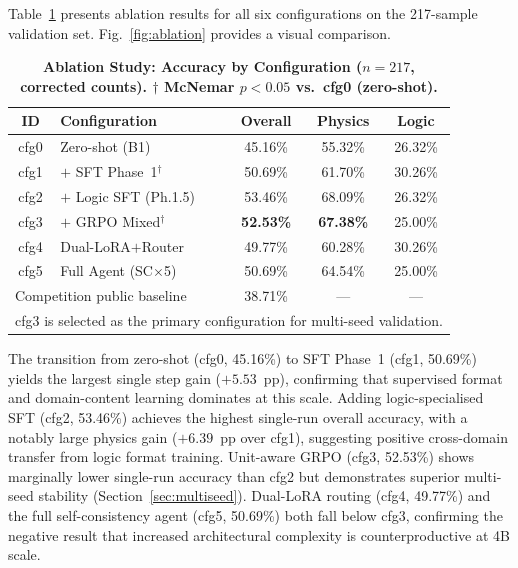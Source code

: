 \documentclass{ieeeaccess}
\begin{document}
Table~\ref{tab:ablation} presents ablation results for all six
configurations on the 217-sample validation set.
Fig.~\ref{fig:ablation} provides a visual comparison.

\begin{table}[t]
\caption{\textbf{Ablation Study: Accuracy by Configuration
  ($n=217$, corrected counts).
  $\dagger$ McNemar $p<0.05$ vs.\ cfg0 (zero-shot).}}
\label{tab:ablation}
\centering
\setlength{\tabcolsep}{3.5pt}
\begin{tabular}{clccc}
\toprule
\textbf{ID} & \textbf{Configuration}
  & \textbf{Overall} & \textbf{Physics} & \textbf{Logic} \\
\midrule
cfg0 & Zero-shot (B1)             & 45.16\%          & 55.32\%          & 26.32\% \\
cfg1 & $+$ SFT Phase~1$^\dagger$  & 50.69\%          & 61.70\%          & 30.26\% \\
cfg2 & $+$ Logic SFT (Ph.1.5)     & 53.46\%          & 68.09\%          & 26.32\% \\
cfg3 & $+$ GRPO Mixed$^\dagger$   & \textbf{52.53\%} & \textbf{67.38\%} & 25.00\% \\
cfg4 & Dual-LoRA$+$Router         & 49.77\%          & 60.28\%          & 30.26\% \\
cfg5 & Full Agent (SC$\times$5)   & 50.69\%          & 64.54\%          & 25.00\% \\
\midrule
\multicolumn{2}{l}{Competition public baseline} & 38.71\% & --- & --- \\
\bottomrule
\multicolumn{5}{l}{\footnotesize cfg3 is selected as the primary
  configuration for multi-seed validation.}
\end{tabular}
\end{table}

The transition from zero-shot (cfg0, 45.16\%) to SFT Phase~1 (cfg1,
50.69\%) yields the largest single step gain ($+5.53$~pp), confirming
that supervised format and domain-content learning dominates at this
scale.
Adding logic-specialised SFT (cfg2, 53.46\%) achieves the highest
single-run overall accuracy, with a notably large physics gain
($+6.39$~pp over cfg1), suggesting positive cross-domain transfer from
logic format training.
Unit-aware GRPO (cfg3, 52.53\%) shows marginally lower single-run
accuracy than cfg2 but demonstrates superior multi-seed stability
(Section~\ref{sec:multiseed}).
Dual-LoRA routing (cfg4, 49.77\%) and the full self-consistency agent
(cfg5, 50.69\%) both fall below cfg3, confirming the negative result
that increased architectural complexity is counterproductive at 4B scale.
\end{document}
